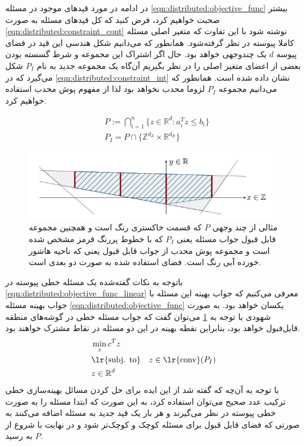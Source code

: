 	در ادامه در مورد قیدهای موجود در مسئله \cref{eqn:distributed:objective_func} بیشتر صحبت خواهیم کرد، فرض کنید که کل قیدهای مسئله به صورت \cref{eqn:distributed:constraint_cont} نوشته شود با این تفاوت که متغیر اصلی مسئله کاملا پیوسته در نظر گرفته‌شود. همانطور که می‌دانیم شکل هندسی این قید در فضای پیوسه $d$ یک چندوجهی خواهد بود. حال اگر اشتراک این مجموعه و شرط گسسته بودن بعضی از اعضای متغیر اصلی را در نظر بگیریم آن‌گاه یک مجموعه جدید به نام $P_I$ شکل می‌گیرد که در \cref{eqn:distributed:constraint_int} نشان داده شده است. همانطور که می‌دانیم مجموعه $P_I$ لزوما محدب نخواهد بود لذا از مفهوم پوش محدب استفاده خواهیم کرد. 
	
\begin{align}
	&P := \bigcap_{i=1}^n \{ z \in \mathbb{R}^d : a_i^Tz \le b_i\} \label{eqn:distributed:constraint_cont} \\
	&P_I = P \cap \{\mathbb{Z}^{d_Z} \times \mathbb{R}^{d_R}\} \label{eqn:distributed:constraint_int}
\end{align}	

\begin{figure}[h]
	\centerline{\includegraphics[width=15cm]{graphics/distributed/polyhedron}}
	\caption{مثالی از چند وجهی $P$ که قسمت خاکستری رنگ است و همچنین مجموعه قابل قبول جواب مسئله یعنی $P_I$ که با خطوط پررنگ قرمز مشخص شده است و مجموعه پوش محدب از جواب قابل قبول یعنی  که ناحیه هاشور خورده آبی رنگ است. فضای استفاده شده به صورت دو بعدی است.}
	\label{fig:distributed:polyhedron}
\end{figure}
	باتوجه به نکات گفته‌شده یک مسئله خطی پیوسته در \cref{eqn:distributed:objective_func_linear} معرفی می‌کنیم که جواب بهینه‌ این مسئله با جواب بهینه مسئله \cref{eqn:distributed:objective_func} یکسان خواهد بود. به صورت شهودی با توجه به \cref{fig:distributed:polyhedron} می‌توان گفت که جواب مسئله خطی در گوشه‌های منطقه‌ قابل‌فبول خواهد بود، بنابراین نقطه بهینه در این دو مسئله در نقاط مشترک خواهند بود. 
	\begin{align}\label{eqn:distributed:objective_func_linear}
	&\min_{z}c^Tz \notag \\
	&\text{\lr{subj. to}} \quad z \in \text{\lr{conv}}(P_I) \notag \\
	&z \in \mathbb{R}^d
	\end{align}
	با توجه به آن‌چه که گفته شد از این ایده برای حل کردن مسائل بهینه‌سازی خطی ترکیب عدد صحیح می‌توان استفاده کرد، به این صورت که ابتدا مسئله را به صورت خطی پیوسته در نظر می‌گیرند و هر بار یک قید جدید به مسئله اضافه می‌کنند به صورتی که فضای قابل قبول برای مسئله کوچک و کوچک‌تر شود و در نهایت با شروع از $P$ به  رسید.
	
